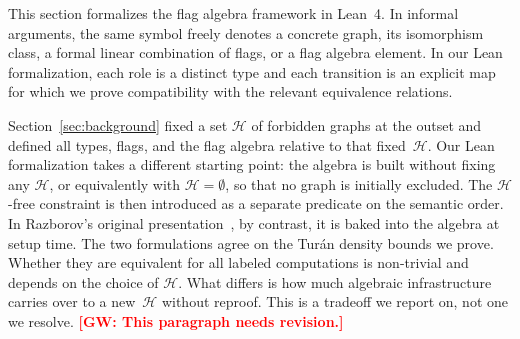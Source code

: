 \documentclass{article}
\newcommand{\tdensity}[2]{\pi(#1;\,#2)}
\newcommand{\lean}[1]{\texttt{#1}}
\newcommand{\gw}[1]{\textcolor{red}{\textbf{[GW: #1]}}}
\begin{document}

This section formalizes the flag algebra framework in Lean~4.
In informal arguments, the same symbol freely denotes a concrete graph,
its isomorphism class, a formal linear combination of flags, or a flag algebra
element.  In our Lean formalization, each role is a distinct type and each transition is an
explicit map for which we prove compatibility with the relevant equivalence relations.

Section~\ref{sec:background} fixed a set $\mathcal{H}$ of forbidden graphs at
the outset and defined all types, flags, and the flag algebra relative to that
fixed~$\mathcal{H}$.  Our Lean formalization takes a different starting point:
the algebra is built without fixing any $\mathcal{H}$, or equivalently with
$\mathcal{H} = \emptyset$, so that no graph is initially excluded.  The
$\mathcal{H}$-free constraint is then introduced as a separate predicate on
the semantic order.  In Razborov's original
presentation~\cite{razborov2007flag}, by contrast, it is baked into the algebra
at setup time.  The two formulations agree on the Tur\'an density bounds we
prove.  Whether they are equivalent for all labeled computations is non-trivial
and depends on the choice of $\mathcal{H}$.  What differs is how much algebraic
infrastructure carries over to a new~$\mathcal{H}$ without reproof.  This is a
tradeoff we report on, not one we resolve.
\gw{This paragraph needs revision.}
\end{document}
